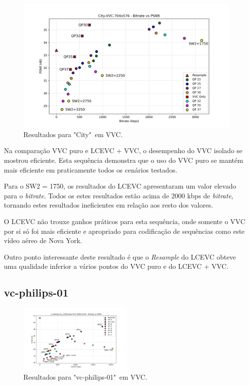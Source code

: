 \begin{figure}[h]
    \centering
    \includegraphics[width=1.0\textwidth]{img/City-VVC.png}
    \caption{Resultados para "City"\ em \acrshort{VVC}. \cite{xiph}}
    \label{fig:City-VVC}
\end{figure}

Na comparação \acrshort{VVC} puro e \acrshort{LCEVC} + \acrshort{VVC}, o desempenho
do \acrshort{VVC} isolado se mostrou eficiente. Esta sequência demonstra que o uso do
\acrshort{VVC} puro se mantém mais eficiente em praticamente todos os cenários testados.

Para o SW2 = 1750, os resultados do \acrshort{LCEVC} apresentaram um valor elevado para o
\textit{bitrate}. Todos os estes resultados estão acima de 2000 kbps de \textit{bitrate},
tornando estes resultados ineficientes em relação aos resto dos valores.


O \acrshort{LCEVC} não trouxe ganhos práticos para esta sequência, onde somente o
\acrshort{VVC} por si só foi mais eficiente e apropriado para codificação de sequências
como este vídeo aéreo de Nova York. 

Outro ponto interessante deste resultado é que o \textit{Resample} do \acrshort{LCEVC} obteve
uma qualidade inferior a vários pontos do \acrshort{VVC} puro e do \acrshort{LCEVC} + \acrshort{VVC}.


\newpage

\subsection{vc-philips-01}

\begin{figure}[h]
    \centering
    \includegraphics[width=0.5\textwidth]{img/vc-philips-01_120frames-VVC.png}
    \caption{Resultados para "vc-philips-01"\ em \acrshort{VVC}.}
    \label{fig:vc-philips-01-VVC}
\end{figure}

